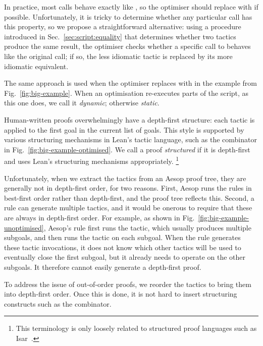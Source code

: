 In practice, most  calls behave exactly like , so the optimiser should replace  with  if possible.
Unfortunately, it is tricky to determine whether any particular  call has this property, so we propose a straightforward alternative:
using a procedure introduced in Sec.~\ref{sec:script:equality} that determines whether two tactics produce the same result, the optimiser checks whether a specific call to  behaves like the original  call; if so, the less idiomatic tactic is replaced by its more idiomatic equivalent.

The same approach is used when the optimiser replaces  with  in the example from Fig.~\ref{fig:big-example}.
When an optimisation re-executes parts of the script, as this one does, we call it \emph{dynamic}; otherwise \emph{static}.

Human-written proofs overwhelmingly have a depth-first structure: each tactic is applied to the first goal in the current list of goals.
This style is supported by various structuring mechanisms in Lean's tactic language, such as the  combinator in Fig.~\ref{fig:big-example-optimised}.
We call a proof \emph{structured} if it is depth-first and uses Lean's structuring mechanisms appropriately.%
\footnote{This terminology is only loosely related to structured proof languages such as Isar~\cite{Isar}.}

Unfortunately, when we extract the tactics from an Aesop proof tree, they are generally not in depth-first order, for two reasons.
First, Aesop runs the rules in best-first order rather than depth-first, and the proof tree reflects this.
Second, a rule can generate multiple tactics, and it would be onerous to require that these are always in depth-first order.
For example, as shown in Fig.~\ref{fig:big-example-unoptimised}, Aesop's  rule first runs the  tactic, which usually produces multiple subgoals, and then runs the  tactic on each subgoal.
When the rule generates these tactic invocations, it does not know which other tactics will be used to eventually close the first subgoal, but it already needs to operate on the other subgoals.
It therefore cannot easily generate a depth-first proof.

To address the issue of out-of-order proofs, we reorder the tactics to bring them into depth-first order.
Once this is done, it is not hard to insert structuring constructs such as the  combinator.

